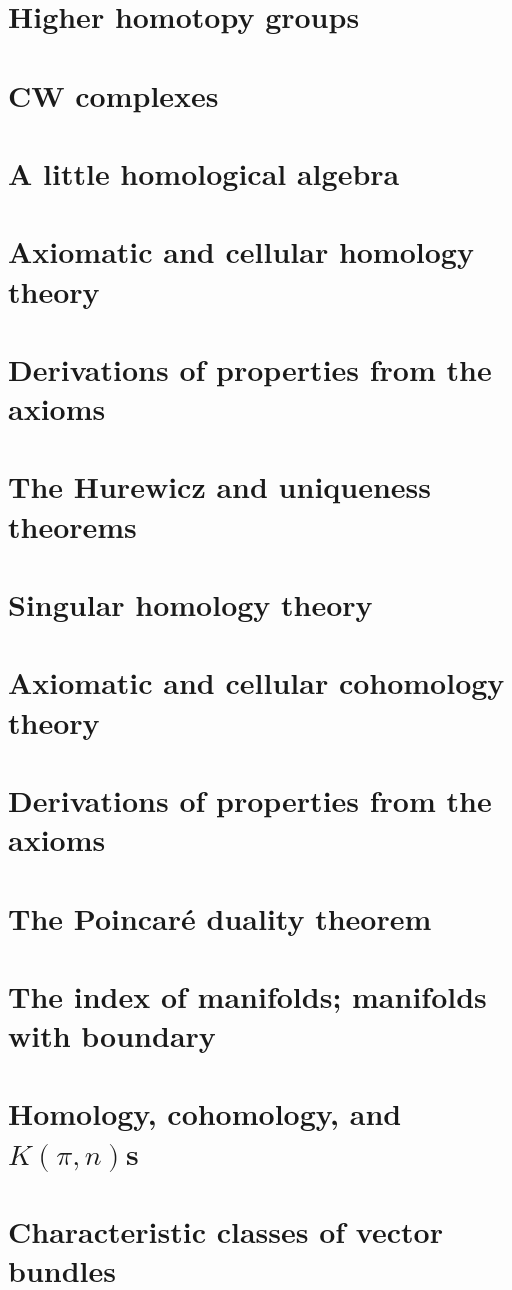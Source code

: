\documentclass[oneside]{amsbook}
\begin{document}
\chapter{Higher homotopy groups}


\chapter{CW complexes}


\setcounter{chapter}{11}
\chapter{A little homological algebra}


\chapter{Axiomatic and cellular homology theory}


\chapter{Derivations of properties from the axioms}


\chapter{The Hurewicz and uniqueness theorems}


\chapter{Singular homology theory}


\setcounter{chapter}{17}
\chapter{Axiomatic and cellular cohomology theory}


\chapter{Derivations of properties from the axioms}


\chapter{The Poincaré duality theorem}


\chapter{The index of manifolds; manifolds with boundary}


\chapter{Homology, cohomology, and $K(\pi, n)$s}


\chapter{Characteristic classes of vector bundles}

\end{document}
